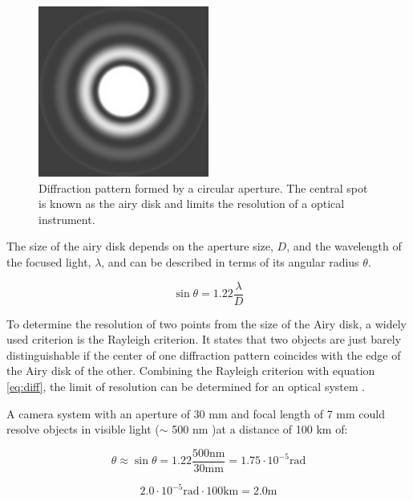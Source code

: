 \begin{figure}[htb]
\begin{center}
\includegraphics[width=0.5\textwidth]{figures/navtheory/airy}
\caption{Diffraction pattern formed by a circular aperture. The central spot is known as the airy disk and limits the resolution of a optical instrument.}
\label{airy}
\end{center}
\end{figure}

The size of the airy disk depends on the aperture size, $D$, and the wavelength of the focused light, $\lambda$, and can be described in terms of its angular radius $\theta$.

\begin{equation}
\label{eq:diff}
\sin \theta = 1.22 \dfrac{\lambda}{D}
\end{equation}

To determine the resolution of two points from the size of the Airy disk, a widely used criterion is the Rayleigh criterion. It states that two objects are just barely distinguishable if the center of one diffraction pattern coincides with the edge of the Airy disk of the other. Combining the Rayleigh criterion with equation \ref{eq:diff}, the limit of resolution can be determined for an optical system \cite{uniphys}.

A camera system with an aperture of 30 mm and focal length of 7 mm could resolve objects in visible light ($\sim$ 500 nm )at a distance of 100  km of: 

\begin{equation}
\theta\approx \sin \theta=1.22 \dfrac{500 \mathrm{nm}}{30 \mathrm{mm}} = 1.75 \cdot 10^{-5} \mathrm{rad}
\end{equation} 


\begin{equation}
2.0 \cdot 10 ^{-5} \mathrm{rad} \cdot 100 \mathrm{km} = 2.0 \mathrm{m} 
\end{equation}

